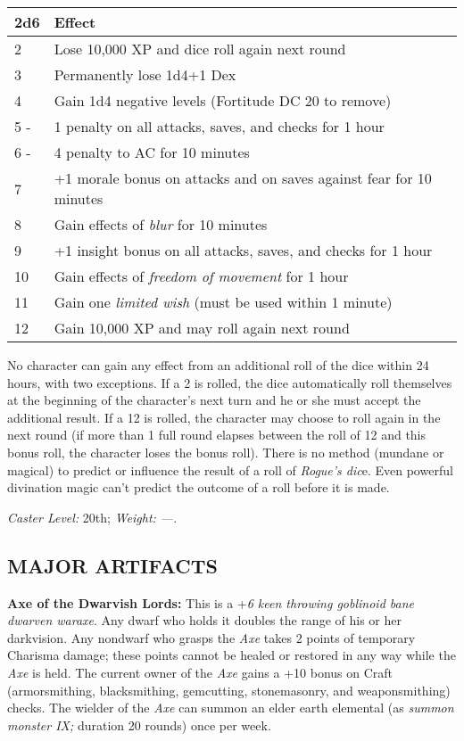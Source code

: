 \documentclass{article}
\begin{document}
\begin{tabular}{|>{\raggedright}p{14pt}|>{\raggedright}p{272pt}|}
\hline
2\textbf{d6 } & E\textbf{ffect }\tabularnewline
\hline
2  & Lose 10,000 XP and dice roll again next round \tabularnewline
\hline
3  & Permanently lose 1d4+1 Dex \tabularnewline
\hline
4  & Gain 1d4 negative levels (Fortitude DC 20 to remove) \tabularnewline
\hline
5 - & 1 penalty on all attacks, saves, and checks for 1 hour \tabularnewline
\hline
6 - & 4 penalty to AC for 10 minutes \tabularnewline
\hline
7  & +1 morale bonus on attacks and on saves against fear for 10 minutes \tabularnewline
\hline
8  & Gain effects of \textit{blur }for 10 minutes \tabularnewline
\hline
9  & +1 insight bonus on all attacks, saves, and checks for 1 hour \tabularnewline
\hline
10  & Gain effects of \textit{freedom of movement }for 1 hour \tabularnewline
\hline
11  & Gain one \textit{limited wish }(must be used within 1 minute) \tabularnewline
\hline
12  & Gain 10,000 XP and may roll again next round \tabularnewline
\hline
\end{tabular}

No character can gain any effect from an additional roll of the dice within 24 
hours, with two exceptions. If a 2 is rolled, the dice automatically roll themselves 
at the beginning of the character's next turn and he or she must accept the additional 
result. If a 12 is rolled, the character may choose to roll again in the next round 
(if more than 1 full round elapses between the roll of 12 and this bonus roll, 
the character loses the bonus roll). There is no method (mundane or magical) to 
predict or influence the result of a roll of \textit{Rogue's dic}e. Even powerful 
divination magic can't predict the outcome of a roll before it is made. 

\textit{Caster Level: }20th; \textit{Weight: ---}. 

\vspace{12pt}
\subsection*{{\LARGE{}MAJOR ARTIFACTS }}

\vspace{12pt}
\textbf{Axe of the Dwarvish Lords: }This is a +\textit{6 keen throwing goblinoid 
bane dwarven waraxe}. Any dwarf who holds it doubles the range of his or her darkvision. 
Any nondwarf who grasps the \textit{Axe }takes 2 points of temporary Charisma damage; 
these points cannot be healed or restored in any way while the \textit{Axe }is 
held. The current owner of the \textit{Axe }gains a +10 bonus on Craft (armorsmithing, 
blacksmithing, gemcutting, stonemasonry, and weaponsmithing) checks. The wielder 
of the \textit{Axe }can summon an elder earth elemental (as \textit{summon monster 
IX; }duration 20 rounds) once per week. 
\end{document}
